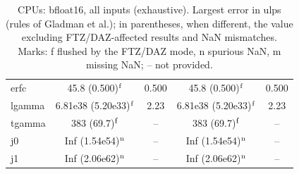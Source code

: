 \begin{table}
\begin{small}
\begin{tabular}{|l|cc|cc|}
erfc & 45.8 (0.500)$^{\rm f}$ & 0.500 & 45.8 (0.500)$^{\rm f}$ & 0.500 \\
lgamma & 6.81e38 (5.20e33)$^{\rm f}$ & 2.23 & 6.81e38 (5.20e33)$^{\rm f}$ & 2.23 \\
tgamma & 383 (69.7)$^{\rm f}$ & -- & 383 (69.7)$^{\rm f}$ & -- \\
j0 & Inf (1.54e54)$^{\rm n}$ & -- & Inf (1.54e54)$^{\rm n}$ & -- \\
j1 & Inf (2.06e62)$^{\rm n}$ & -- & Inf (2.06e62)$^{\rm n}$ & -- \\
\hline
\end{tabular}
\end{small}
\caption{CPUs: bfloat16, all inputs (exhaustive). Largest error in ulps (rules of Gladman et al.); in parentheses, when different, the value excluding FTZ/DAZ-affected results and NaN mismatches. Marks: f flushed by the FTZ/DAZ mode, n spurious NaN, m missing NaN; -- not provided.}
\label{tab:bf16cpu}
\end{table}
